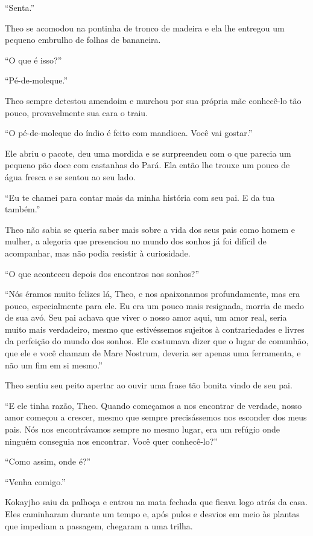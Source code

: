 ``Senta.''

Theo se acomodou na pontinha de tronco de madeira e ela lhe entregou um
pequeno embrulho de folhas de bananeira.

``O que é isso?''

``Pé-de-moleque.''

Theo sempre detestou amendoim e murchou por sua própria mãe conhecê-lo
tão pouco, provavelmente sua cara o traiu.

``O pé-de-moleque do índio é feito com mandioca. Você vai gostar.''

Ele abriu o pacote, deu uma mordida e se surpreendeu com o que parecia
um pequeno pão doce com castanhas do Pará. Ela então lhe trouxe um pouco
de água fresca e se sentou ao seu lado.

``Eu te chamei para contar mais da minha história com seu pai. E da tua
também.''

Theo não sabia se queria saber mais sobre a vida dos seus pais como
homem e mulher, a alegoria que presenciou no mundo dos sonhos já foi
difícil de acompanhar, mas não podia resistir à curiosidade.

``O que aconteceu depois dos encontros nos sonhos?''

``Nós éramos muito felizes lá, Theo, e nos apaixonamos profundamente,
mas era pouco, especialmente para ele. Eu era um pouco mais resignada,
morria de medo de sua avó. Seu pai achava que viver o nosso amor aqui,
um amor real, seria muito mais verdadeiro, mesmo que estivéssemos
sujeitos à contrariedades e livres da perfeição do mundo dos sonhos. Ele
costumava dizer que o lugar de comunhão, que ele e você chamam de Mare
Nostrum, deveria ser apenas uma ferramenta, e não um fim em si mesmo.''

Theo sentiu seu peito apertar ao ouvir uma frase tão bonita vindo de seu
pai.

``E ele tinha razão, Theo. Quando começamos a nos encontrar de verdade,
nosso amor começou a crescer, mesmo que sempre precisássemos nos
esconder dos meus pais. Nós nos encontrávamos sempre no mesmo lugar, era
um refúgio onde ninguém conseguia nos encontrar. Você quer conhecê-lo?''

``Como assim, onde é?''

``Venha comigo.''

Kokayjho saiu da palhoça e entrou na mata fechada que ficava logo atrás
da casa. Eles caminharam durante um tempo e, após pulos e desvios em
meio às plantas que impediam a passagem, chegaram a uma trilha.

